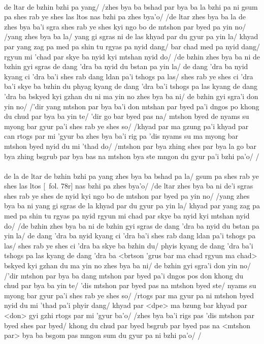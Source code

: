 \documentclass[12pt]{article}
\begin{document}
\textbf{\TVA}\\
de ltar de bzhin bzhi pa yang/ /zhes bya ba bshad par bya ba la bzhi pa ni gsum pa shes rab ye shes las ltos nas bzhi pa zhes bya'o/ /de ltar zhes bya ba la de zhes bya ba'i sgra shes rab ye shes kyi ngo bo de mtshon par byed pa yin no/ /yang zhes bya ba la/ yang gi sgras ni de las khyad par du gyur pa yin la/ khyad par yang zag pa med pa shin tu rgyas pa nyid dang/ bar chad med pa nyid dang/ rgyun mi 'chad par skye ba nyid kyi mtshan nyid do/ /de bzhin zhes bya ba ni de bzhin gyi sgras de dang 'dra ba nyid du bstan pa yin la/ de dang 'dra ba nyid kyang ci 'dra ba'i shes rab dang ldan pa'i tshogs pa las/ shes rab ye shes ci 'dra ba'i skye ba bzhin du phyag kyang de dang 'dra ba'i tshogs pa las kyang de dang 'dra ba bskyed kyi gzhan du ni ma yin no zhes bya ba ni/ de bzhin gyi sgra'i don yin no/ /'dir yang mtshon par bya ba'i don mtshan par byed pa'i dngos po khong du chud par bya ba yin te/ 'dir go bar byed pas na/ mtshon byed de nyams su myong bar gyur pa'i shes rab ye shes so/ /khyad par ma gzung pa'i khyad par can rtogs par mi 'gyur ba zhes bya ba'i rig pa 'dis nyams su ma myong bar mtshon byed nyid du mi 'thad do/ /mtshon par bya zhing shes par bya la go bar bya zhing bsgrub par bya bas na mtshon bya ste mngon du gyur pa'i bzhi pa'o/ /\\

\textbf{\TVB}\\
de la de ltar de bzhin bzhi pa yang zhes bya ba bshad pa la/ gsum pa shes rab ye shes las ltos [\TVB\ fol. 78r] nas bzhi pa zhes bya'o/ /de ltar zhes bya ba ni de'i sgras shes rab ye shes de nyid kyi ngo bo de mtshon par byed pa yin no/ /yang zhes bya ba ni yang gi sgras de la khyad par du gyur pa yin la/ khyad par yang zag pa med pa shin tu rgyas pa nyid rgyun mi chad par skye ba nyid kyi mtshan nyid do/ /de bzhin zhes bya ba ni de bzhin gyi sgras de dang 'dra ba nyid du bstan pa yin la/ de dang 'dra ba nyid kyang ci 'dra ba'i shes rab dang ldan pa'i tshogs pa las/ shes rab ye shes ci 'dra ba skye ba bzhin du/ phyis kyang de dang 'dra ba'i tshogs pa las kyang de dang 'dra ba <brtson 'grus bar ma chad rgyun ma chad> bskyed kyi gzhan du ma yin no zhes bya ba ni/ de bzhin gyi sgra'i don yin no/ /'dir mtshon par bya ba dang mtshon par byed pa'i dngos pos don khong du chud par bya ba yin te/ 'dis mtshon par byed pas na mtshon byed ste/ nyams su myong bar gyur pa'i shes rab ye shes so/ /rtogs par ma gyur pa ni mtshon byed nyid du mi 'thad pa'i phyir dang/ khyad par <dpe> ma bzung bar khyad par <don> gyi gzhi rtogs par mi 'gyur ba'o/ /zhes bya ba'i rigs pas 'dis mtshon par byed shes par byed/ khong du chud par byed bsgrub par byed pas na <mtshon par> bya ba bsgom pas mngon sum du gyur pa ni bzhi pa'o/ /\\
\end{document}
